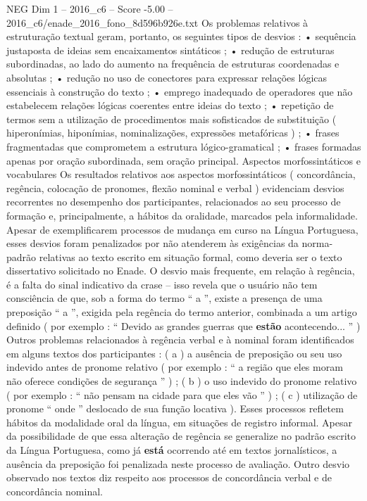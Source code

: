 \begin{textsample}{NEG Dim 1 – 2016\_c6 – Score -5.00 – 2016\_c6/enade\_2016\_fono\_8d596b926e.txt}
Os problemas relativos à estruturação textual geram, portanto, os seguintes tipos de desvios : • sequência justaposta de ideias sem encaixamentos sintáticos ; • redução de estruturas subordinadas, ao lado do aumento na frequência de estruturas coordenadas e absolutas ; • redução no uso de conectores para expressar relações lógicas essenciais à construção do texto ; • emprego inadequado de operadores que não estabelecem relações lógicas coerentes entre ideias do texto ; • repetição de termos sem a utilização de procedimentos mais sofisticados de substituição ( hiperonímias, hiponímias, nominalizações, expressões metafóricas ) ; • frases fragmentadas que comprometem a estrutura lógico-gramatical ; • frases formadas apenas por oração subordinada, sem oração principal.
Aspectos morfossintáticos e vocabulares Os resultados relativos aos aspectos morfossintáticos ( concordância, regência, colocação de pronomes, flexão nominal e verbal ) evidenciam desvios recorrentes no desempenho dos participantes, relacionados ao seu processo de formação e, principalmente, a hábitos da oralidade, marcados pela informalidade.
Apesar de exemplificarem processos de mudança em curso na Língua Portuguesa, esses desvios foram penalizados por não atenderem às exigências da norma-padrão relativas ao texto escrito em situação formal, como deveria ser o texto dissertativo solicitado no Enade.
O desvio mais frequente, em relação à regência, é a falta do sinal indicativo da crase – isso revela que o usuário não tem consciência de que, sob a forma do termo “ a ”, existe a presença de uma preposição “ a ”, exigida pela regência do termo anterior, combinada a um artigo definido ( por exemplo : “ Devido as grandes guerras que \textbf{estão} acontecendo... ” ) Outros problemas relacionados à regência verbal e à nominal foram identificados em alguns textos dos participantes : ( a ) a ausência de preposição ou seu uso indevido antes de pronome relativo ( por exemplo : “ a região que eles moram não oferece condições de segurança ” ) ; ( b ) o uso indevido do pronome relativo ( por exemplo : “ não pensam na cidade para que eles vão ” ) ; ( c ) utilização de pronome “ onde ” deslocado de sua função locativa ).
Esses processos refletem hábitos da modalidade oral da língua, em situações de registro informal.
Apesar da possibilidade de que essa alteração de regência se generalize no padrão escrito da Língua Portuguesa, como já \textbf{está} ocorrendo até em textos jornalísticos, a ausência da preposição foi penalizada neste processo de avaliação.
Outro desvio observado nos textos diz respeito aos processos de concordância verbal e de concordância nominal.

\end{textsample}
